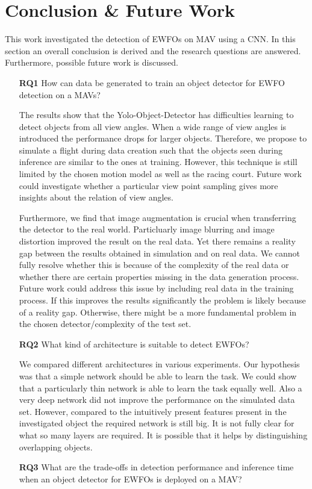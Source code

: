 \chapter{Conclusion \& Future Work}

This work investigated the detection of \acp{EWFO} on \ac{MAV} using a \ac{CNN}. In this section an overall conclusion is derived and the research questions are answered. Furthermore, possible future work is discussed.

\begin{enumerate}
	\item[\textbf{RQ1}]How can data be generated to train an object detector for \ac{EWFO} detection on a \acp{MAV}?
	
	The results show that the \ac{Yolo}-Object-Detector has difficulties learning to detect objects from all view angles. When a wide range of view angles is introduced the performance drops for larger objects. Therefore, we propose to simulate a flight during data creation such that the objects seen during inference are similar to the ones at training. However, this technique is still limited by the chosen motion model as well as the racing court. Future work could investigate whether a particular view point sampling gives more insights about the relation of view angles.
	
	Furthermore, we find that image augmentation is crucial when transferring the detector to the real world. Particluarly image blurring and image distortion improved the result on the real data. Yet there remains a reality gap between the results obtained in simulation and on real data. We cannot fully resolve whether this is because of the complexity of the real data or whether there are certain properties missing in the data generation process. Future work could address this issue by including real data in the training process. If this improves the results significantly the problem is likely because of a reality gap. Otherwise, there might be a more fundamental problem in the chosen detector/complexity of the test set.
	
	\item[\textbf{RQ2}]What kind of architecture is suitable to detect \acp{EWFO}?
	
	We compared different architectures in various experiments. Our hypothesis was that a simple network should be able to learn the task. We could show that a particularly thin network is able to learn the task equally well. Also a very deep network did not improve the performance on the simulated data set. However, compared to the intuitively present features present in the investigated object the required network is still big. It is not fully clear for what so many layers are required. It is possible that it helps by distinguishing overlapping objects.
	
	\item[\textbf{RQ3}]What are the trade-offs in detection performance and inference time when an object detector for \acp{EWFO} is deployed on a \ac{MAV}?
\end{enumerate}




